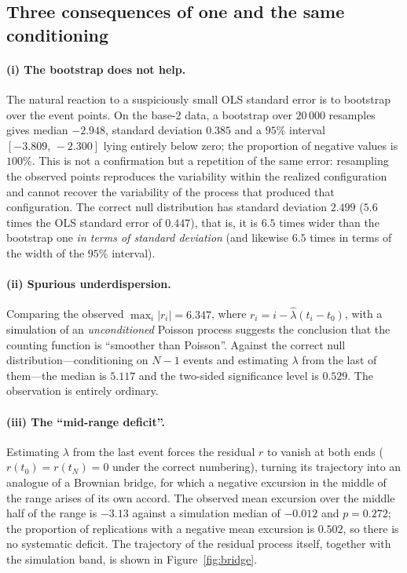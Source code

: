 \documentclass[11pt,a4paper]{article}
\theoremstyle{plain}
\theoremstyle{remark}
\begin{document}
\subsection{Three consequences of one and the same conditioning}

\paragraph{(i) The bootstrap does not help.} The natural reaction to a
suspiciously small OLS standard error is to bootstrap over the event points. On
the base-2 data, a bootstrap over $20\,000$ resamples gives median $-2.948$,
standard deviation $0.385$ and a $95\%$ interval $[-3.809,\,-2.300]$ lying
entirely below zero; the proportion of negative values is $100\%$. This is not a
confirmation but a repetition of the same error: resampling the observed points
reproduces the variability within the realized configuration and cannot recover
the variability of the process that produced that configuration. The correct
null distribution has standard deviation $2.499$ ($5.6$ times the OLS standard
error of $0.447$), that is, it is $6.5$ times
wider than the bootstrap one \emph{in terms of standard deviation} (and likewise
$6.5$ times in terms of the width of the $95\%$ interval).

\paragraph{(ii) Spurious underdispersion.} Comparing the observed
$\max_i|r_i|=6.347$, where $r_i=i-\hat\lambda(t_i-t_0)$, with a simulation of an
\emph{unconditioned} Poisson process suggests the conclusion that the counting
function is ``smoother than Poisson''. Against the correct null
distribution---conditioning on $N-1$ events and estimating $\lambda$ from the
last of them---the median is $5.117$ and the two-sided significance level is
$0.529$. The observation is entirely ordinary.

\paragraph{(iii) The ``mid-range deficit''.} Estimating $\lambda$ from the last
event forces the residual $r$ to vanish at both ends ($r(t_0)=r(t_N)=0$ under
the correct numbering), turning its trajectory into an analogue of a Brownian
bridge, for which a negative excursion in the middle of the range arises of its
own accord. The observed mean excursion over the middle half of the range is
$-3.13$ against a simulation median of $-0.012$ and $p=0.272$; the proportion of
replications with a negative mean excursion is $0.502$, so there is no
systematic deficit. The trajectory of the residual process itself, together with
the simulation band, is shown in Figure~\ref{fig:bridge}.
\end{document}
